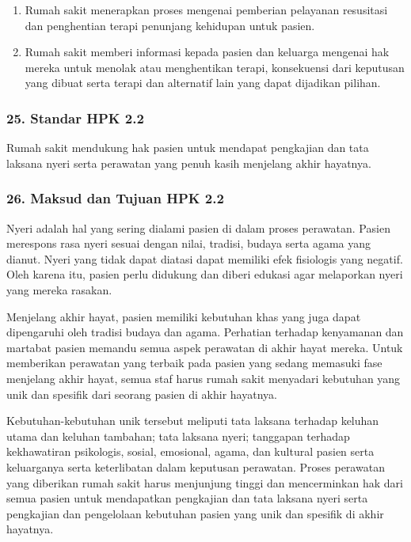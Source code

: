 \documentclass[
]{book}
\providecommand{\tightlist}{%
  \setlength{\itemsep}{0pt}\setlength{\parskip}{0pt}}
\begin{document}
\begin{enumerate}
\def\labelenumi{\alph{enumi}.}
\tightlist
\item
  Rumah sakit menerapkan proses mengenai pemberian pelayanan resusitasi dan penghentian terapi penunjang kehidupan untuk pasien.
\item
  Rumah sakit memberi informasi kepada pasien dan keluarga mengenai hak mereka untuk menolak atau menghentikan terapi, konsekuensi dari keputusan yang dibuat serta terapi dan alternatif lain yang dapat dijadikan pilihan.
\end{enumerate}

\hypertarget{standar-hpk-2.2}{%
\subsubsection*{25. Standar HPK 2.2}\label{standar-hpk-2.2}}

Rumah sakit mendukung hak pasien untuk mendapat pengkajian dan tata laksana nyeri serta perawatan yang penuh kasih menjelang akhir hayatnya.

\hypertarget{maksud-dan-tujuan-hpk-2.2}{%
\subsubsection*{26. Maksud dan Tujuan HPK 2.2}\label{maksud-dan-tujuan-hpk-2.2}}

Nyeri adalah hal yang sering dialami pasien di dalam proses perawatan. Pasien merespons rasa nyeri sesuai dengan nilai, tradisi, budaya serta agama yang dianut. Nyeri yang tidak dapat diatasi dapat memiliki efek fisiologis yang negatif. Oleh karena itu, pasien perlu didukung dan diberi edukasi agar melaporkan nyeri yang mereka rasakan.

Menjelang akhir hayat, pasien memiliki kebutuhan khas yang juga dapat dipengaruhi oleh tradisi budaya dan agama. Perhatian terhadap kenyamanan dan martabat pasien memandu semua aspek perawatan di akhir hayat mereka. Untuk memberikan perawatan yang terbaik pada pasien yang sedang memasuki fase menjelang akhir hayat, semua staf harus rumah sakit menyadari kebutuhan yang unik dan spesifik dari seorang pasien di akhir hayatnya.

Kebutuhan-kebutuhan unik tersebut meliputi tata laksana terhadap keluhan utama dan keluhan tambahan; tata laksana nyeri; tanggapan terhadap kekhawatiran psikologis, sosial, emosional, agama, dan kultural pasien serta keluarganya serta keterlibatan dalam keputusan perawatan. Proses perawatan yang diberikan rumah sakit harus menjunjung tinggi dan mencerminkan hak dari semua pasien untuk mendapatkan pengkajian dan tata laksana nyeri serta pengkajian dan pengelolaan kebutuhan pasien yang unik dan spesifik di akhir hayatnya.
\end{document}
